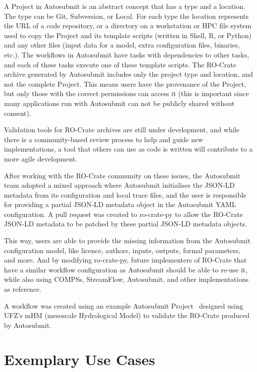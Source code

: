 \documentclass[10pt,letterpaper]{article}
\begin{document}
A Project in Autosubmit is an abstract concept that has a type and a location.
The type can be Git, Subversion, or Local.
For each type the location represents the URL of a code repository, or a directory on a workstation or HPC file system used to copy the Project and its template scripts (written in Shell, R, or Python) and any other files (input data for a model, extra configuration files, binaries, etc.).
The workflows in Autosubmit have tasks with dependencies to other tasks, and each of these tasks execute one of these template scripts.
The RO-Crate archive generated by Autosubmit includes only the project type and location, and not the complete Project.
This means users have the provenance of the Project, but only those with the correct permissions can access it (this is important since many applications run with Autosubmit can not be publicly shared without consent).

Validation tools for RO-Crate archives are still under development, and while there is a community-based review process to help and guide new implementations, a tool that others can use as code is written will contribute to a more agile development.

After working with the RO-Crate community on these issues, the Autosubmit team adopted a mixed approach where Autosubmit initialises the JSON-LD metadata from its configuration and local trace files, and the user is responsible for providing a partial JSON-LD metadata object in the Autosubmit YAML configuration.
A pull request was created to ro-crate-py to allow the RO-Crate JSON-LD metadata to be patched by these partial JSON-LD metadata objects.

This way, users are able to provide the missing information from the Autosubmit configuration model, like licence, authors, inputs, outputs, formal parameters, and more.
And by modifying ro-crate-py, future implementers of RO-Crate that have a similar workflow configuration as Autosubmit should be able to re-use it, while also using COMPSs, StreamFlow, Autosubmit, and other implementations as reference.

A workflow was created using an example Autosubmit Project~\cite{Kinoshita 2023} designed using UFZ's mHM (mesoscale Hydrological Model)
\cite{Samaniego 2010}\cite{Kumar 2013} to validate the RO-Crate produced by Autosubmit.


\section{Exemplary Use Cases}\label{exemplary-use-cases}
\end{document}
